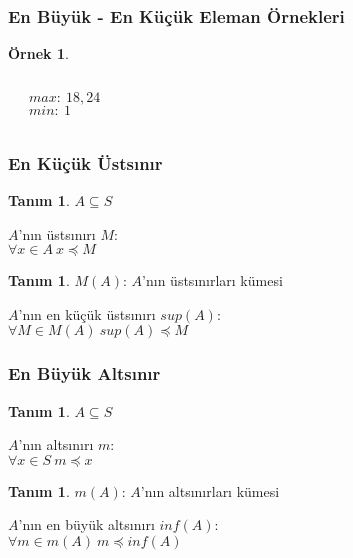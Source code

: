 \documentclass[dvipsnames]{beamer}
\theoremstyle{definition}
\newtheorem{tanim}[theorem]{Tanım}
\theoremstyle{example}
\newtheorem{ornek}[theorem]{Örnek}
\theoremstyle{plain}
\begin{document}
\begin{frame}
  \frametitle{En Büyük - En Küçük Eleman Örnekleri}

  \begin{ornek}
    \begin{columns}
      \begin{center}
      \end{center}

      $max:~18,24$\\
      $min:~1$
    \end{columns}
  \end{ornek}
\end{frame}

\begin{frame}
  \frametitle{En Küçük Üstsınır}

  \begin{tanim}
    $A \subseteq S$

    \medskip
    $A$'nın \alert{üstsınırı} $M$:\\
    $\forall x \in A~x \preceq M$
  \end{tanim}

  \pause
  \begin{tanim}
    $M(A)$: $A$'nın üstsınırları kümesi

    \medskip
    $A$'nın \alert{en küçük üstsınırı} $sup(A)$:\\
    $\forall M \in M(A)~sup(A) \preceq M$
  \end{tanim}
\end{frame}

\begin{frame}
  \frametitle{En Büyük Altsınır}

  \begin{tanim}
    $A \subseteq S$

    \medskip
    $A$'nın \alert{altsınırı} $m$:\\
    $\forall x \in S~m \preceq x$
  \end{tanim}

  \pause
  \begin{tanim}
    $m(A)$: $A$'nın altsınırları kümesi

    \medskip
    $A$'nın \alert{en büyük altsınırı} $inf(A)$:\\
    $\forall m \in m(A)~m \preceq inf(A)$
  \end{tanim}
\end{frame}
\end{document}
